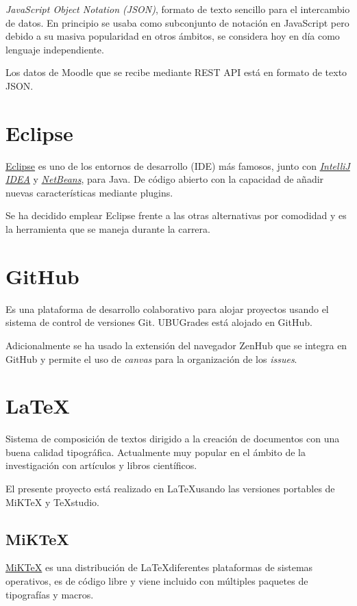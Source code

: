 \textit{JavaScript Object Notation (JSON)}, formato de texto sencillo para el intercambio de datos. En principio se usaba como subconjunto de notación en JavaScript pero debido a su masiva popularidad en otros ámbitos, se considera hoy en día como lenguaje independiente.

Los datos de Moodle que se recibe mediante REST API está en formato de texto JSON.

\section{Eclipse}

\href{https://www.eclipse.org/}{Eclipse} es uno de los entornos de desarrollo (IDE) más famosos, junto con
\href{https://www.jetbrains.com}{\textit{IntelliJ IDEA}} y \href{https://netbeans.org/}{\textit{NetBeans}}, para Java. De código abierto con la capacidad de añadir nuevas características mediante plugins.

Se ha decidido emplear Eclipse frente a las otras alternativas por comodidad y es la herramienta que se maneja durante la carrera.


\section{GitHub}
Es una plataforma de desarrollo colaborativo para alojar proyectos usando el sistema de control de versiones Git. UBUGrades está alojado en GitHub.

Adicionalmente se ha usado la extensión del navegador ZenHub que se integra en GitHub y permite el uso de \textit{canvas} para la organización de los \textit{issues}.


\section{LaTeX}

Sistema de composición de textos dirigido a la creación de documentos con una buena calidad tipográfica. Actualmente muy popular en el ámbito de la investigación con artículos y libros científicos.

El presente proyecto está realizado en \LaTeX usando las versiones portables de MiKTeX y TeXstudio. 

\subsection{MiKTeX}

\href{https://miktex.org/}{MiKTeX} es una distribución de \LaTeX diferentes plataformas de sistemas operativos, es de código libre y viene incluido con múltiples paquetes de tipografías y macros.

